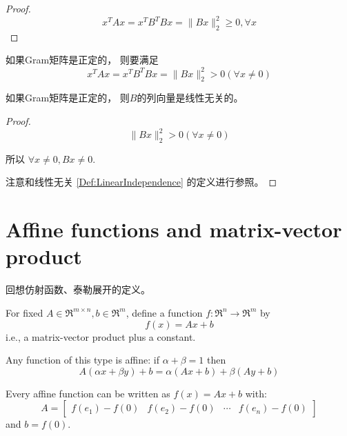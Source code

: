 \begin{proof}
    \begin{equation} x^{T} A x=x^{T} B^{T} B x=\|B x\|_{2}^{2} \geq 0 , \forall x \end{equation}
\end{proof}

\begin{theorem}
    如果Gram矩阵是正定的， 则要满足
    \begin{equation} x^{T} A x=x^{T} B^{T} B x=\|B x\|_{2}^{2}>0 ( \forall x \neq 0) \end{equation}
\end{theorem}

\begin{corollary}
    如果Gram矩阵是正定的， 则$B$的列向量是线性无关的。
\end{corollary}

\begin{proof}
    \begin{equation}\|B x\|_{2}^{2}>0 ( \forall x \neq 0)\end{equation}

所以 $\forall x \neq 0, Bx \neq 0  $.

    注意和线性无关 \ref{Def:LinearIndependence} 的定义进行参照。
\end{proof}

\section{Affine functions and matrix-vector product}


回想仿射函数、泰勒展开的定义。

For fixed $ A \in \mathfrak{R}^{m \times n}, b \in \mathfrak{R}^{m} $, define a function $ f: \mathfrak{R}^{n} \rightarrow \mathfrak{R}^{m} $ by
\begin{equation}
f(x)=A x+b
\end{equation}
i.e., a matrix-vector product plus a constant.

Any function of this type is affine: if $ \alpha+\beta=1 $ then
\begin{equation}
A(\alpha x+\beta y)+b=\alpha(A x+b)+\beta(A y+b)
\end{equation}

Every affine function can be written as $ f(x)=A x+b $ with:
\begin{equation}
A=\left[\begin{array}{llll}
f\left(e_{1}\right)-f(0) & f\left(e_{2}\right)-f(0) & \cdots & f\left(e_{n}\right)-f(0)
\end{array}\right]
\end{equation}
and $ b=f(0) $.

